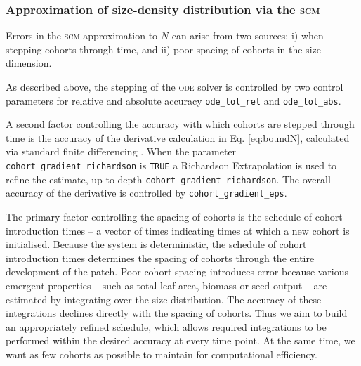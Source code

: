 \documentclass[10pt,twoside]{article}
\begin{document}
\subsubsection{Approximation of size-density distribution via the \textsc{scm}}
\label{approximation-of-size-density-distribution-via-the-ebt}

Errors in the \textsc{scm} approximation to \(N\) can arise from two sources:
i) when stepping cohorts through time, and
ii) poor spacing of cohorts in the size dimension.

As described above, the stepping of the \textsc{ode} solver is controlled by two
control parameters for relative and absolute accuracy
\texttt{ode\_tol\_rel} and \texttt{ode\_tol\_abs}.

A second factor controlling the accuracy with which cohorts are stepped
through time is the accuracy of the derivative calculation in Eq.
\ref{eq:boundN}, calculated via standard finite differencing
\citep{Abramowitz-2012}. When the parameter
\texttt{cohort\_gradient\_richardson} is \texttt{TRUE} a Richardson Extrapolation
\citep{Stoer-2002} is used to refine the estimate, up to depth
\texttt{cohort\_gradient\_richardson}. The overall accuracy of the
derivative is controlled by \texttt{cohort\_gradient\_eps}.

The primary factor controlling the spacing of cohorts is the schedule of
cohort introduction times -- a vector of times indicating times at which
a new cohort is initialised. Because the system is deterministic, the
schedule of cohort introduction times determines the spacing of cohorts
through the entire development of the patch. Poor cohort spacing
introduces error because various emergent properties -- such as total
leaf area, biomass or seed output -- are estimated by integrating over
the size distribution. The accuracy of these integrations declines
directly with the spacing of cohorts. Thus we aim to build an
appropriately refined schedule, which allows required integrations to be
performed within the desired accuracy at every time point. At the same
time, we want as few cohorts as possible to maintain for computational
efficiency.
\end{document}
